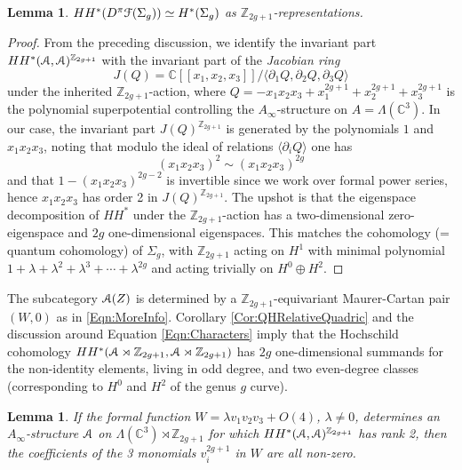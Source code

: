 \documentclass[reqno,10pt]{amsart}
\numberwithin{equation}{section}
\newcommand{\bC}{{\mathbb C}}
\newcommand{\bZ}{{\mathbb Z}}
\newcommand{\scrF}{\EuScript{F}}
\newcommand{\scrA}{\EuScript{A}}
\newtheorem{Lemma}[thm]{Lemma}
\theoremstyle{remark}
\begin{document}
\begin{Lemma}  \label{Lem:ComputeonCurve}
$HH^*(D^{\pi}\scrF(\Sigma_g)) \simeq H^*(\Sigma_g)$ as $\bZ_{2g+1}$-representations.
\end{Lemma}

\begin{proof}
From the preceding discussion, we identify the invariant part $HH^*(\scrA,\scrA)^{\bZ_{2g+1}}$ with the invariant part of the \emph{Jacobian ring} 
\[
J(Q) = \bC[[x_1,x_2,x_3]] / \langle \partial_1 Q, \partial _2 Q, \partial_3 Q\rangle
\]
under the inherited $\bZ_{2g+1}$-action, where $Q = -x_1x_2x_3 + x_1^{2g+1}+x_2^{2g+1}+x_3^{2g+1}$ is the polynomial superpotential controlling the $A_{\infty}$-structure on $A = \Lambda(\bC^3)$.  In our case, the invariant part $J(Q)^{\bZ_{2g+1}}$ is generated by the polynomials $1$ and $x_1x_2x_3$, noting that modulo the ideal of relations $\langle \partial_i Q\rangle$ one has
\[
(x_1x_2x_3)^2 \sim (x_1x_2x_3)^{2g}
\]  
and that $1-(x_1x_2x_3)^{2g-2}$ is invertible since we work over formal power series, hence $x_1x_2x_3$ has order 2 in $J(Q)^{\bZ_{2g+1}}$.  The upshot is that the eigenspace decomposition of $HH^*$ under the $\bZ_{2g+1}$-action has a two-dimensional zero-eigenspace and $2g$ one-dimensional eigenspaces. This matches the cohomology (= quantum cohomology) of $\Sigma_g$, with $\bZ_{2g+1}$ acting on $H^1$ with minimal polynomial $1+\lambda + \lambda^2+\lambda^3+\cdots+\lambda^{2g}$ and acting trivially on $H^0 \oplus H^2$.
\end{proof}

The subcategory $\scrA(Z)$ is determined by a $\bZ_{2g+1}$-equivariant Maurer-Cartan pair $(W,0)$ as in \eqref{Eqn:MoreInfo}.  Corollary \ref{Cor:QHRelativeQuadric} and the discussion around Equation \ref{Eqn:Characters} imply that the Hochschild cohomology $HH^*(\scrA \rtimes \bZ_{2g+1},\scrA \rtimes \bZ_{2g+1})$ has $2g$ one-dimensional summands for the non-identity elements, living in odd degree, and two even-degree classes (corresponding to $H^0$ and $H^2$ of the genus $g$ curve).   


\begin{Lemma} \label{Lem:HHnotsmall}
If the formal function $W = \lambda v_1v_2 v_3 + O(4)$, $\lambda \neq 0$, determines an $A_{\infty}$-structure $\scrA$ on $\Lambda(\bC^3)\rtimes \bZ_{2g+1}$ for which $HH^*(\scrA,\scrA)^{\bZ_{2g+1}}$ has rank 2, then the coefficients of the 3 monomials $v_i^{2g+1}$ in $W$ are all non-zero.
\end{Lemma}
\end{document}
